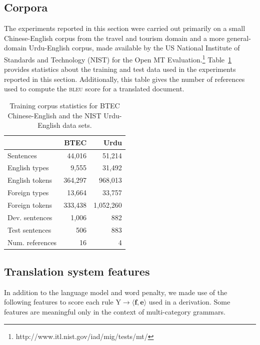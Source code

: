 \subsection{Corpora}

The experiments reported in this section were carried out primarily on a small Chinese-English corpus from the travel and tourism domain \citep{btec} and a more general-domain Urdu-English corpus, made available by the US National Institute of Standards and Technology (NIST) for the Open MT Evaluation.\footnote{http://www.itl.nist.gov/iad/mig/tests/mt/} Table~\ref{tab:corpbtecur} provides statistics about the training and test data used in the experiments reported in this section.  Additionally, this table gives the number of references used to compute the \textsc{bleu} score for a translated document.

\begin{table}[h]
\caption{Training corpus statistics for BTEC Chinese-English and the NIST Urdu-English data sets.}
\begin{center}
\begin{tabular}{l|r|r}
& BTEC & Urdu \\
\hline
Sentences & 44,016 & 51,214 \\
English types & 9,555 & 31,492 \\
English tokens & 364,297 & 968,013 \\
Foreign types & 13,664 & 33,757 \\
Foreign tokens & 333,438 & 1,052,260 \\
\hline
Dev. sentences & 1,006 & 882 \\
Test sentences & 506 & 883 \\
Num. references & 16 & 4
\end{tabular}
\end{center}
\label{tab:corpbtecur}
\end{table}%

\subsection{Translation system features}

In addition to the language model and word penalty, we made use of the following features to score each rule $\textrm{Y} \rightarrow \langle \textbf{f},\textbf{e} \rangle$ used in a derivation.  Some features are meaningful only in the context of multi-category grammars.

